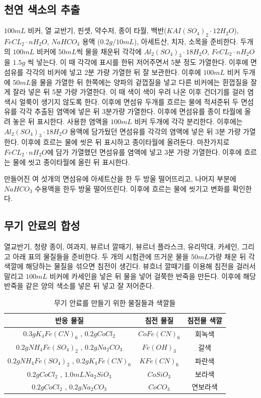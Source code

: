 \documentclass[%
 reprint,
 amsmath,amssymb,
 aps,
]{revtex4-2}
\begin{document}
\subsection{\label{sec:level2}천연 색소의 추출}
$100mL$ 비커, 열 교반기, 핀셋, 약수저, 종이 타월, 백반($KAI(SO_{4})_{2}\cdot 12H_{2}O$), $FeCL_{2}\cdot nH_{2}O$, $NaHCO_{3}$ 용액 ($0.2g/10mL$), 아세트산, 치자, 소목을 준비한다. 두개의 $100mL$ 비커에 $50mL$씩 물을 채운뒤 각각에 $Al_{2}(SO_{4})_{3}\cdot18H_{2}O$, $FeCL_{2}\cdot nH_{2}O$을 $1.5g$ 씩 넣는다. 이 때 각각에 표시를 한뒤 저어주면서 5분 정도 가열한다. 이후에 면섬유를 각각의 비커에 넣고 2분 가량 가열한 뒤 잘 보관한다. 이후에 $100mL$ 비커 두개에 $50mL$을 물을 가열한 뒤 한쪽에는 양파의 겉껍질을 넣고 다른 비커에는 흰껍질을 잘게 잘라 넣은 뒤 5분 가량 가열한다. 이 때 색이 색이 우려 나온 이후 건더기를 걸러 염색시 얼룩이 생기지 않도록 한다. 이후에 면섬유 두개를 흐르는 물에 적셔준뒤 두 면섬유를 각각 추출된 염액에 넣은 뒤 3분가량 가열한다. 이후에 면섬유를 종이 타월에 올려 놓은 뒤 표시한다.  사용한 염액을 $100mL$ 비커 두개에 각각 분리한다. 이후에는 $Al_{2}(SO_{4})_{3}\cdot18H_{2}O$ 용액에 담가뒀던 면섬유를 각각의 염액에 넣은 뒤 3분 가량 가열한다. 이후에 흐르는 물에 씻은 뒤 표시하고 종이타월에 올려둔다. 마찬가지로 $FeCL_{2}\cdot nH_{2}O$에 담가 가열했던 면섬유를 염액에 넣고 3분 가량 가열한다. 이후에 흐르는 물에 씻고 종이타월에 올린 뒤 표시한다.

만들어진 여 섯개의 면섬유에 아세트산을 한 두 방울 떨어뜨리고, 나머지 부분에 $NaHCO_{3}$ 수용액을 한두 방울 떨어뜨린다. 이후에 흐르는 물에 씻기고 변화를 확인한다.

\subsection{\label{sec:level2}무기 안료의 합성}
열교반기, 청량 종이, 여과지, 뷰르너 깔때기, 뷰르너 플라스크, 유리막대, 카세인, 그리고 아래 표의 물질들을 준비한다. 두 개의 시험관에 뜨거운 물을 $50mL$가량 채운 뒤 각 색깔에 해당하는 물질을 섞으면 침전이 생긴다. 뷰흐너 깔때기를 이용해 침전을 걸러서 말리고 $100mL$ 비커에 카세인을 넣은 뒤 물을 넣어 걸쭉한 반죽을 만든다. 이후에 해당 반죽을 같은 양의 색소를 넣은 뒤 넣고 잘 저어준다.
\begin{table}[]
\begin{tabular}{c|c|c} \hline \hline
반응 물질 & 침전 물질 & 침전물 색깔 \\ \hline
$0.3g K_{4}Fe(CN)_{6}$ , $0.2g CoCl_{2}$ & $CoFe(CN)_{6}$ & 회녹색 \\ \hline
$0.2g NH_{4}Fe(SO_{4})_{2}$ , $0.2g Na_{2}CO_{3}$ & $Fe(OH)_{3}$ & 갈색 \\ \hline
$0.2g NH_{4}Fe(SO_{4})_{2}$ , $0.2g K_{4}Fe(CN)_{6}$ & $KFe(CN)_{6}$ & 파란색 \\ \hline
$0.2g CoCl_{2}$ , $1.0mL Na_{2}SiO_{3}$ & $CoSiO_{3}$ & 보라색 \\ \hline
$0.2g CoCl_{2}$ , $0.2g Na_{2}CO_{3}$ & $CoCO_{3}$ & 연보라색 \\ \hline \hline
\end{tabular}
\caption{\label{tab:C18}무기 안료를 만들기 위한 물질들과 색깔들}
\end{table}
\end{document}
